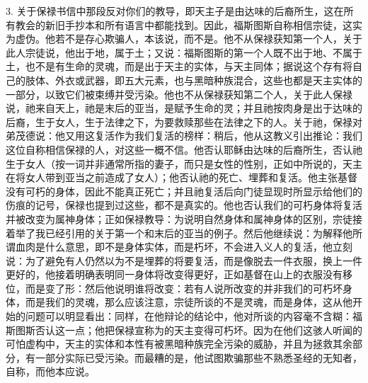 3. 关于保禄书信中那段反对你们的教导，即天主子是由达味的后裔所生，这在所有教会的新旧手抄本和所有语言中都能找到。因此，福斯图斯自称相信宗徒，这实为虚伪。他若不是存心欺骗人，本该说，而不是。他不从保禄获知第一个人，关于此人宗徒说，他出于地，属于土；又说：福斯图斯的第一个人既不出于地、不属于土，也不是有生命的灵魂，而是出于天主的实体，与天主同体；据说这个存有将自己的肢体、外衣或武器，即五大元素，也与黑暗种族混合，这些也都是天主实体的一部分，以致它们被束缚并受污染。他也不从保禄获知第二个人，关于此人保禄说，祂来自天上，祂是末后的亚当，是赋予生命的灵；并且祂按肉身是出于达味的后裔，生于女人，生于法律之下，为要救赎那些在法律之下的人。关于祂，保禄对弟茂德说：他又用这复活作为我们复活的榜样：稍后，他从这教义引出推论：我们这位自称相信保禄的人，对这些一概不信。他否认耶稣由达味的后裔所生，否认祂生于女人（按一词并非通常所指的妻子，而只是女性的性别，正如中所说的，天主在将女人带到亚当之前造成了女人）；他否认祂的死亡、埋葬和复活。他主张基督没有可朽的身体，因此不能真正死亡；并且祂复活后向门徒显现时所显示给他们的伤痕的记号，保禄也提到过这些，都不是真实的。他也否认我们的可朽身体将复活并被改变为属神身体；正如保禄教导：为说明自然身体和属神身体的区别，宗徒接着举了我已经引用的关于第一个和末后的亚当的例子。然后他继续说：为解释他所谓血肉是什么意思，即不是身体实体，而是朽坏，不会进入义人的复活，他立刻说：为了避免有人仍然以为不是埋葬的将要复活，而是像脱去一件衣服，换上一件更好的，他接着明确表明同一身体将改变得更好，正如基督在山上的衣服没有移位，而是变了形：然后他说明谁将改变：若有人说所改变的并非我们的可朽坏身体，而是我们的灵魂，那么应该注意，宗徒所谈的不是灵魂，而是身体，这从他开始的问题可以明显看出：同样，在他辩论的结论中，他对所谈的内容毫不含糊：福斯图斯否认这一点；他把保禄宣称为的天主变得可朽坏。因为在他们这骇人听闻的可怕虚构中，天主的实体和本性有被黑暗种族完全污染的威胁，并且为拯救其余部分，有一部分实际已受污染。而最糟的是，他试图欺骗那些不熟悉圣经的无知者，自称，而他本应说。\par


